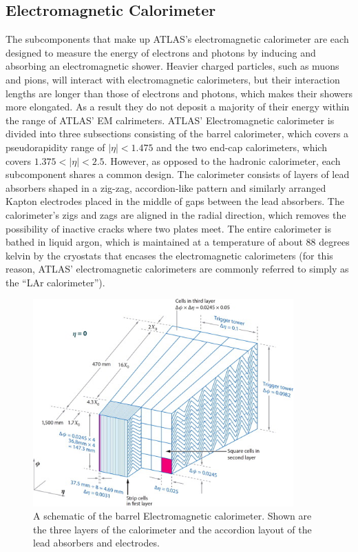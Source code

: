 
\subsection{Electromagnetic Calorimeter}
The subcomponents that make up ATLAS's electromagnetic calorimeter are each designed to measure the energy of electrons and photons by inducing and absorbing an electromagnetic shower.
Heavier charged particles, such as muons and pions, will interact with electromagnetic calorimeters, but their interaction lengths are longer than those of electrons and photons, which makes their showers more elongated.
As a result they do not deposit a majority of their energy within the range of ATLAS' EM calrimeters.
ATLAS' Electromagnetic calorimeter is divided into three subsections consisting of the barrel calorimeter, which covers a pseudorapidity range of $|\eta| < 1.475$ and the two end-cap calorimeters, which covers $1.375 < |\eta| < 2.5$.
However, as opposed to the hadronic calorimeter, each subcomponent shares a common design.
The calorimeter consists of layers of lead absorbers shaped in a zig-zag, accordion-like pattern and similarly arranged Kapton electrodes placed in the middle of gaps between the lead absorbers.
The calorimeter's zigs and zags are aligned in the radial direction, which removes the possibility of inactive cracks where two plates meet.
The entire calorimeter is bathed in liquid argon, which is maintained at a temperature of about 88 degrees kelvin by the cryostats that encases the electromagnetic calorimeters (for this reason, ATLAS' electromagnetic calorimeters are commonly referred to simply as the ``LAr calorimeter'').


\begin{figure}
\begin{center}
\includegraphics[width=100mm]{figures/atlas/ElectromagneticCalorimeter.jpg}
\end{center}
  \caption{A schematic of the barrel Electromagnetic calorimeter.  Shown are the three layers of the calorimeter and the accordion layout of the lead absorbers and electrodes.}
  \label{img:EmBarrelCalorimeter}
\end{figure}


